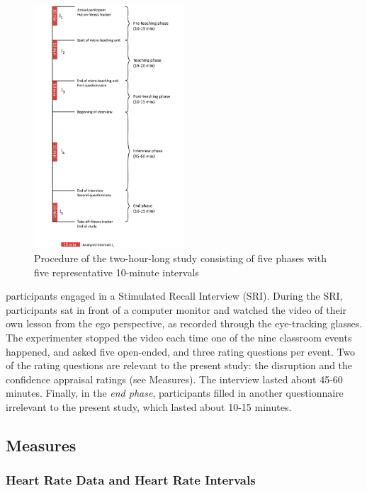 \documentclass[preprint, 3p,
authoryear]{elsarticle} %
\begin{document}
\begin{figure}
  \centering
  \includegraphics[width=0.5\textwidth]{images/Timeline_smaller.pdf}
  \caption{Procedure of the two-hour-long study consisting of five phases with five representative 10-minute intervals}
  \label{Procedure of the two-hour-long study consisting of five phases with five representative 10-minute intervals}
\end{figure}

\noindent participants engaged in a Stimulated Recall Interview (SRI).
During the SRI, participants sat in front of a computer monitor and
watched the video of their own lesson from the ego perspective, as
recorded through the eye-tracking glasses. The experimenter stopped the
video each time one of the nine classroom events happened, and asked
five open-ended, and three rating questions per event. Two of the rating
questions are relevant to the present study: the disruption and the
confidence appraisal ratings (see Measures). The interview lasted about
45-60 minutes. Finally, in the \emph{end phase}, participants filled in
another questionnaire irrelevant to the present study, which lasted
about 10-15 minutes.

\subsection{Measures}\label{measures}

\subsubsection{Heart Rate Data and Heart Rate
Intervals}\label{heart-rate-data-and-heart-rate-intervals}
\end{document}
